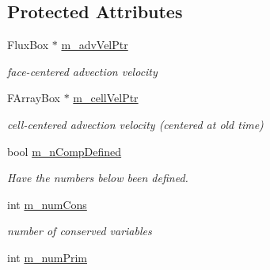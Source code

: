 \subsection*{Protected Attributes}
\begin{DoxyCompactItemize}
\item 
\hypertarget{class_advection_physics_a2190804e60d76f635a4038cd73181f36}{Flux\-Box $\ast$ \hyperlink{class_advection_physics_a2190804e60d76f635a4038cd73181f36}{m\-\_\-adv\-Vel\-Ptr}}\label{class_advection_physics_a2190804e60d76f635a4038cd73181f36}

\begin{DoxyCompactList}\small\item\em face-\/centered advection velocity \end{DoxyCompactList}\item 
\hypertarget{class_advection_physics_aba4173a2c90618f66566560d07de35d4}{F\-Array\-Box $\ast$ \hyperlink{class_advection_physics_aba4173a2c90618f66566560d07de35d4}{m\-\_\-cell\-Vel\-Ptr}}\label{class_advection_physics_aba4173a2c90618f66566560d07de35d4}

\begin{DoxyCompactList}\small\item\em cell-\/centered advection velocity (centered at old time) \end{DoxyCompactList}\item 
\hypertarget{class_advection_physics_a10c269a32c67b6651665ca09f9005af7}{bool \hyperlink{class_advection_physics_a10c269a32c67b6651665ca09f9005af7}{m\-\_\-n\-Comp\-Defined}}\label{class_advection_physics_a10c269a32c67b6651665ca09f9005af7}

\begin{DoxyCompactList}\small\item\em Have the numbers below been defined. \end{DoxyCompactList}\item 
\hypertarget{class_advection_physics_ac71f679ddec1513ac5f600840592a63b}{int \hyperlink{class_advection_physics_ac71f679ddec1513ac5f600840592a63b}{m\-\_\-num\-Cons}}\label{class_advection_physics_ac71f679ddec1513ac5f600840592a63b}

\begin{DoxyCompactList}\small\item\em number of conserved variables \end{DoxyCompactList}\item 
\hypertarget{class_advection_physics_aba83ecb3c338828921f17cba7faa2dc6}{int \hyperlink{class_advection_physics_aba83ecb3c338828921f17cba7faa2dc6}{m\-\_\-num\-Prim}}\label{class_advection_physics_aba83ecb3c338828921f17cba7faa2dc6}


\end{DoxyCompactItemize}

